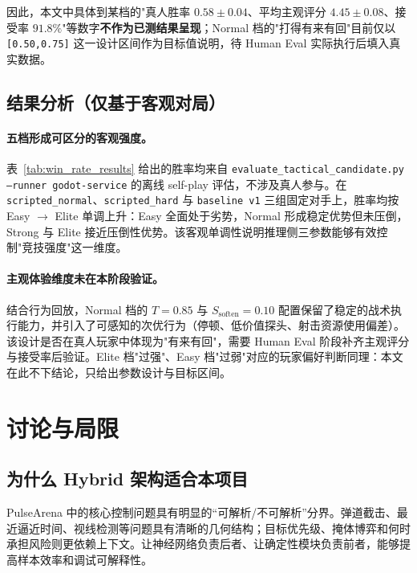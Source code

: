 \documentclass[UTF8,a4paper,11pt]{ctexart}
\begin{document}
因此，本文中具体到某档的"真人胜率 $0.58\pm0.04$、平均主观评分 $4.45\pm0.08$、接受率 $91.8\%$"等数字\textbf{不作为已测结果呈现}；Normal 档的"打得有来有回"目前仅以 \texttt{[0.50,0.75]} 这一设计区间作为目标值说明，待 Human Eval 实际执行后填入真实数据。

\subsection{结果分析（仅基于客观对局）}
\paragraph{五档形成可区分的客观强度。}
表~\ref{tab:win_rate_results} 给出的胜率均来自 \texttt{evaluate\_tactical\_candidate.py --runner godot-service} 的离线 self-play 评估，不涉及真人参与。在 \texttt{scripted\_normal}、\texttt{scripted\_hard} 与 \texttt{baseline v1} 三组固定对手上，胜率均按 Easy $\rightarrow$ Elite 单调上升：Easy 全面处于劣势，Normal 形成稳定优势但未压倒，Strong 与 Elite 接近压倒性优势。该客观单调性说明推理侧三参数能够有效控制"竞技强度"这一维度。

\paragraph{主观体验维度未在本阶段验证。}
结合行为回放，Normal 档的 $T=0.85$ 与 $S_{\mathrm{soften}}=0.10$ 配置保留了稳定的战术执行能力，并引入了可感知的次优行为（停顿、低价值探头、射击资源使用偏差）。该设计是否在真人玩家中体现为"有来有回"，需要 Human Eval 阶段补齐主观评分与接受率后验证。Elite 档"过强"、Easy 档"过弱"对应的玩家偏好判断同理：本文在此不下结论，只给出参数设计与目标区间。

\section{讨论与局限}

\subsection{为什么 Hybrid 架构适合本项目}
PulseArena 中的核心控制问题具有明显的“可解析/不可解析”分界。弹道截击、最近逼近时间、视线检测等问题具有清晰的几何结构；目标优先级、掩体博弈和何时承担风险则更依赖上下文。让神经网络负责后者、让确定性模块负责前者，能够提高样本效率和调试可解释性。
\end{document}
